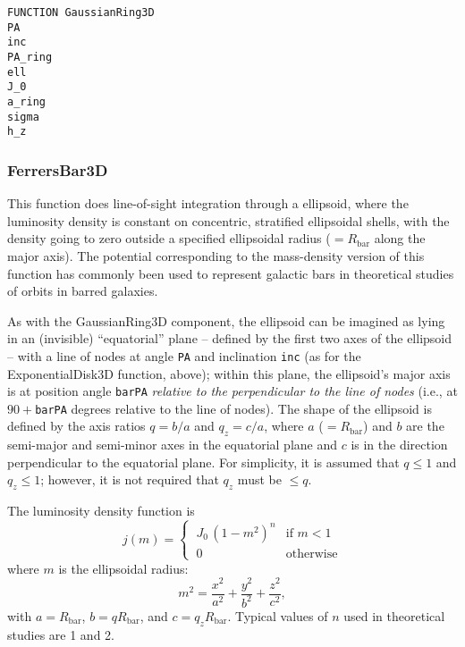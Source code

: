\documentclass[10pt,a4paper,article]{memoir}
\newcommand{\rbar}{\ensuremath{R_{\mathrm{bar}}}}
\begin{document}
\begin{verbatim}
FUNCTION GaussianRing3D
PA
inc
PA_ring
ell
J_0
a_ring
sigma
h_z
\end{verbatim}






\subsubsection{FerrersBar3D}

This function does line-of-sight integration through a \citet{ferrers}
ellipsoid, where the luminosity density is constant on concentric,
stratified ellipsoidal shells, with the density going to zero outside a
specified ellipsoidal radius ($= R_{\mathrm{bar}}$ along the major
axis). The potential corresponding to the mass-density version of this
function has commonly been used to represent galactic bars in
theoretical studies of orbits in barred galaxies.

As with the GaussianRing3D component, the ellipsoid can be imagined as
lying in an (invisible) ``equatorial'' plane -- defined by the first two
axes of the ellipsoid -- with a line of nodes at angle \texttt{PA} and
inclination \texttt{inc} (as for the ExponentialDisk3D function, above);
within this plane, the ellipsoid's major axis is at position angle
\texttt{barPA} \textit{relative to the perpendicular to the line of
nodes} (i.e., at $90 + $\texttt{barPA} degrees relative to the line of
nodes). The shape of the ellipsoid is defined by the axis ratios $q =
b/a$ and $q_{z} = c/a$, where $a$ ($= R_{\mathrm{bar}}$) and $b$ are the
semi-major and semi-minor axes in the equatorial plane and $c$ is in the
direction perpendicular to the equatorial plane. For simplicity, it is
assumed that $q \leq 1$ and $q_{z} \leq 1$; however, it is not required
that $q_{z}$ must be $\leq q$.

The luminosity density function is
\begin{equation}\label{eqn:ferrers}
 j(m) = 
  \begin{cases} 
   \: J_0 \, (1 - m^{2})^{n} & \text{if } m < 1 \\
   \: 0                      & \text{otherwise}
  \end{cases}
\end{equation}
where $m$ is the ellipsoidal radius:
\begin{equation}
m^2 =  \frac{x^2}{a^2} + \frac{y^2}{b^2} + \frac{z^2}{c^2} ,
\end{equation}
with $a = \rbar$, $b = q \rbar$, and $c = q_{z} \rbar$. Typical values of $n$
used in theoretical studies are 1 and 2.
\end{document}
